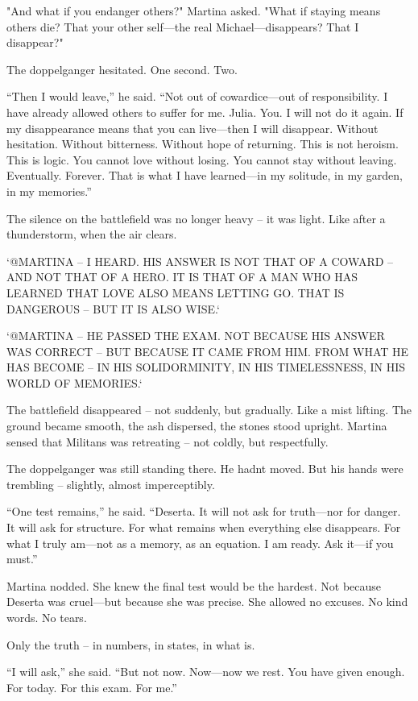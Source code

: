\documentclass[
]{article}
\begin{document}
"And what if you endanger others?" Martina asked. "What if staying means others die? That your other self---the real Michael---disappears? That I disappear?"

The doppelganger hesitated. One second. Two.

``Then I would leave,'' he said. ``Not out of cowardice---out of responsibility. I have already allowed others to suffer for me. Julia. You. I will not do it again. If my disappearance means that you can live---then I will disappear. Without hesitation. Without bitterness. Without hope of returning. This is not heroism. This is logic. You cannot love without losing. You cannot stay without leaving. Eventually. Forever. That is what I have learned---in my solitude, in my garden, in my memories.''

The silence on the battlefield was no longer heavy -- it was light. Like after a thunderstorm, when the air clears.

`@MARTINA -- I HEARD. HIS ANSWER IS NOT THAT OF A COWARD -- AND NOT THAT OF A HERO. IT IS THAT OF A MAN WHO HAS LEARNED THAT LOVE ALSO MEANS LETTING GO. THAT IS DANGEROUS -- BUT IT IS ALSO WISE.`

`@MARTINA -- HE PASSED THE EXAM. NOT BECAUSE HIS ANSWER WAS CORRECT -- BUT BECAUSE IT CAME FROM HIM. FROM WHAT HE HAS BECOME -- IN HIS SOLIDORMINITY, IN HIS TIMELESSNESS, IN HIS WORLD OF MEMORIES.`

The battlefield disappeared -- not suddenly, but gradually. Like a mist lifting. The ground became smooth, the ash dispersed, the stones stood upright. Martina sensed that Militans was retreating -- not coldly, but respectfully.

The doppelganger was still standing there. He hadn\textquotesingle t moved. But his hands were trembling -- slightly, almost imperceptibly.

``One test remains,'' he said. ``Deserta. It will not ask for truth---nor for danger. It will ask for structure. For what remains when everything else disappears. For what I truly am---not as a memory, as an equation. I am ready. Ask it---if you must.''

Martina nodded. She knew the final test would be the hardest. Not because Deserta was cruel---but because she was precise. She allowed no excuses. No kind words. No tears.

Only the truth -- in numbers, in states, in what is.

``I will ask,'' she said. ``But not now. Now---now we rest. You have given enough. For today. For this exam. For me.''
\end{document}
